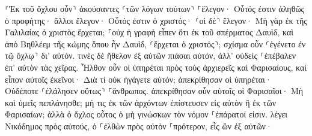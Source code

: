 \documentclass{openreader}
\begin{document}
⸂Ἐκ τοῦ ὄχλου οὖν⸃ ἀκούσαντες ⸂τῶν λόγων τούτων⸃ ⸀ἔλεγον· Οὗτός ἐστιν ἀληθῶς ὁ προφήτης· 
ἄλλοι ἔλεγον· Οὗτός ἐστιν ὁ χριστός· ⸂οἱ δὲ⸃ ἔλεγον· Μὴ γὰρ ἐκ τῆς Γαλιλαίας ὁ χριστὸς ἔρχεται; 
⸀οὐχ ἡ γραφὴ εἶπεν ὅτι ἐκ τοῦ σπέρματος Δαυὶδ, καὶ ἀπὸ Βηθλέεμ τῆς κώμης ὅπου ἦν Δαυὶδ, ⸂ἔρχεται ὁ χριστός⸃; 
σχίσμα οὖν ⸂ἐγένετο ἐν τῷ ὄχλῳ⸃ δι’ αὐτόν. 
τινὲς δὲ ἤθελον ἐξ αὐτῶν πιάσαι αὐτόν, ἀλλ’ οὐδεὶς ⸀ἐπέβαλεν ἐπ’ αὐτὸν τὰς χεῖρας. 
Ἦλθον οὖν οἱ ὑπηρέται πρὸς τοὺς ἀρχιερεῖς καὶ Φαρισαίους, καὶ εἶπον αὐτοῖς ἐκεῖνοι· Διὰ τί οὐκ ἠγάγετε αὐτόν; 
ἀπεκρίθησαν οἱ ὑπηρέται· Οὐδέποτε ⸂ἐλάλησεν οὕτως⸃ ⸀ἄνθρωπος. 
ἀπεκρίθησαν οὖν αὐτοῖς οἱ Φαρισαῖοι· Μὴ καὶ ὑμεῖς πεπλάνησθε; 
μή τις ἐκ τῶν ἀρχόντων ἐπίστευσεν εἰς αὐτὸν ἢ ἐκ τῶν Φαρισαίων; 
ἀλλὰ ὁ ὄχλος οὗτος ὁ μὴ γινώσκων τὸν νόμον ⸀ἐπάρατοί εἰσιν. 
λέγει Νικόδημος πρὸς αὐτούς, ὁ ⸀ἐλθὼν πρὸς αὐτὸν ⸀πρότερον, εἷς ὢν ἐξ αὐτῶν· 
\end{document}
